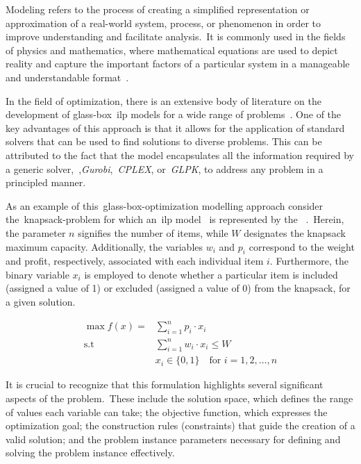 Modeling refers to the process of creating a simplified representation or
approximation of a real-world system, process, or phenomenon in order to improve
understanding and facilitate analysis.~It is commonly used in the fields of
physics and mathematics, where mathematical equations are used to depict reality
and capture the important factors of a particular system in a manageable and
understandable format~\cite{witelski2015methods}.

In the field of optimization, there is an extensive body of literature on the
development of glass-box~\acrshort{ilp} models for a wide range of
problems~\cite{papadimitriou1998combinatorial,nocedal2006numerical,williamson2011design}.
One of the key advantages of this approach is that it allows for the application
of standard solvers that can be used to find solutions to diverse problems. This
can be attributed to the fact that the model encapsulates all the information
required by a generic solver,~\eg{},\textit{Gurobi},~\textit{CPLEX},
or~\textit{GLPK}, to address any problem in a principled manner.

As an example of this~\acrshort{glass-box-optimization} modelling approach
consider the~\acrshort{knapsack-problem} for which an~\acrshort{ilp}
model~\cite{yu2010combinatorial} is represented by the
~.~Herein, the parameter $n$ signifies the number
of items, while $W$ designates the knapsack maximum capacity. Additionally,
the variables $w_{i}$ and $p_{i}$ correspond to the weight and profit,
respectively, associated with each individual item $i$. Furthermore, the binary
variable $x_{i}$ is employed to denote whether a particular item is included
(assigned a value of 1) or excluded (assigned a value of 0) from the knapsack,
for a given solution.

\begin{equation}
      \label{eq:knapsack-ilp}
      \begin{aligned}
            \max f(x) = & \sum_{i=1}^{n} p_i \cdot x_i                           \\
            \text{s.t } & \sum_{i=1}^{n} w_i \cdot x_i \leq W                    \\
                        & x_i \in \{0, 1\} \quad \text{for } i = 1, 2, \ldots, n
      \end{aligned}
\end{equation}

It is crucial to recognize that this formulation highlights several significant
aspects of the problem.~These include the solution space, which defines the
range of values each variable can take; the objective function, which expresses
the optimization goal; the construction rules (constraints) that guide the
creation of a valid solution; and the problem instance parameters necessary for
defining and solving the problem instance effectively.


